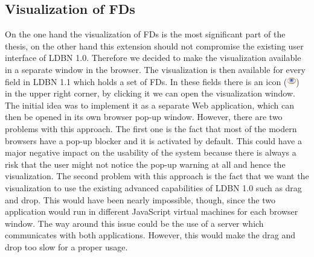 \subsection{Visualization of FDs}
\label{sec:visualization}
On the one hand the visualization of FDs is the most significant 
part of the thesis, 
on the other hand this extension should not compromise the existing 
user interface of LDBN 1.0. Therefore we decided to
make the visualization available in a separate window in the browser. 
The visualization is then available for every field in LDBN 1.1 which 
holds a set of FDs. In these fields there is an 
icon (\includegraphics[scale=0.6]{./img/eye.png}) in the upper right
corner, by clicking it we can open the visualization window.
The initial idea
was to implement it as a separate Web application, which can then be 
opened in its own 
browser pop-up window. However, there are two problems with this approach. The first one is
the fact that most of the modern browsers have a pop-up blocker and it is activated by default.
This could have a major negative impact on the usability of the system because there
is always a risk that the user might not notice the pop-up 
warning at all and hence the visualization. The second problem with this approach is 
the fact that we want the visualization to use the existing 
advanced capabilities of LDBN 1.0 such as drag and drop. 
This would have been nearly impossible, though, since
the two application would run in different JavaScript virtual machines for each
browser window. The way around this issue could be the use of a server
which communicates with both applications. However, 
this would make the drag and drop too slow for a proper usage. 

